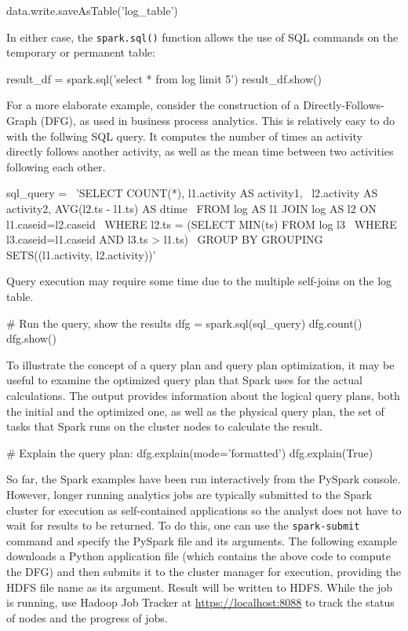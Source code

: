 \begin{pythoncode}
data.write.saveAsTable('log_table')
\end{pythoncode}

In either case, the \texttt{spark.sql()} function allows the use of SQL commands on the temporary or permanent table:

\begin{pythoncode}
result_df = spark.sql('select * from log limit 5')
result_df.show()
\end{pythoncode}

For a more elaborate example, consider the construction of a Directly-Follows-Graph (DFG), as used in business process analytics. This is relatively easy to do with the follwing SQL query. It computes the number of times an activity directly follows another activity, as well as the mean time between two activities following each other. 

\begin{pythoncode}
sql_query = \
'SELECT COUNT(*), l1.activity AS activity1, \
 l2.activity AS activity2, AVG(l2.ts - l1.ts) AS dtime \
  FROM log AS l1 JOIN log AS l2 ON l1.caseid=l2.caseid \
   WHERE l2.ts = (SELECT MIN(ts) FROM log l3 \
    WHERE l3.caseid=l1.caseid AND l3.ts > l1.ts) \
     GROUP BY GROUPING SETS((l1.activity, l2.activity))'
\end{pythoncode}

Query execution may require some time due to the multiple self-joins on the log table. 

\begin{pythoncode}
# Run the query, show the results
dfg = spark.sql(sql_query)
dfg.count()
dfg.show()
\end{pythoncode}

To illustrate the concept of a query plan and query plan optimization, it may be useful to examine the optimized query plan that Spark uses for the actual calculations. The output provides information about the logical query plans, both the initial and the optimized one, as well as the physical query plan, the set of tasks that Spark runs on the cluster nodes to calculate the result.

\begin{pythoncode}
# Explain the query plan:
dfg.explain(mode='formatted')
dfg.explain(True)
\end{pythoncode}

So far, the Spark examples have been run interactively from the PySpark console. However, longer running analytics jobs are typically submitted to the Spark cluster for execution as self-contained applications so the analyst does not have to wait for results to be returned. To do this, one can use the \texttt{spark-submit} command and specify the PySpark file and its arguments. The following example downloads a Python application file (which contains the above code to compute the DFG) and then submits it to the cluster manager for execution, providing the HDFS file name as its argument. Result will be written to HDFS. While the job is running, use Hadoop Job Tracker at \url{https://localhost:8088} to track the status of nodes and the progress of jobs.

